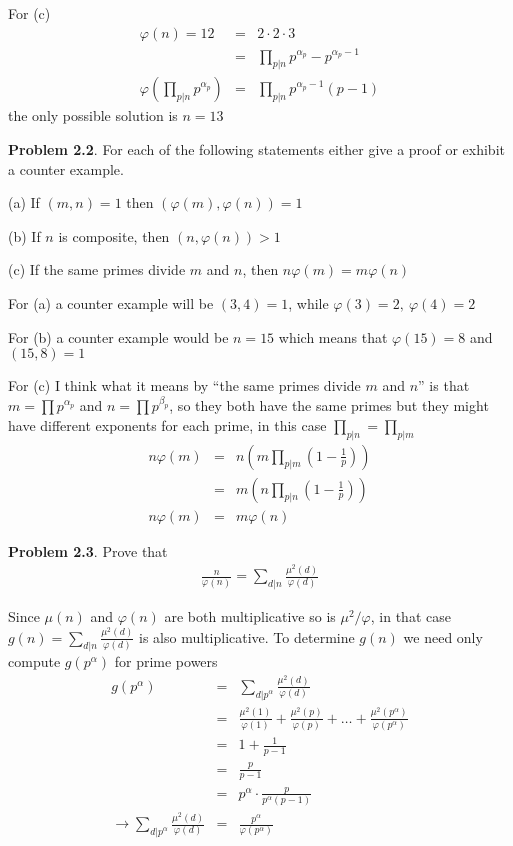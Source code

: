 \documentclass[aps,preprint,preprintnumbers,nofootinbib,showpacs,prd]{revtex4-1}
\newcommand{\nbea}{\begin{eqnarray*}}
\newcommand{\neea}{\end{eqnarray*}}
\begin{document}
For (c)
%
\nbea
\varphi(n) = 12 & = & 2 \cdot 2 \cdot 3 \\
& = & \prod_{p|n} p^{\alpha_p} - p^{\alpha_p-1} \\
\varphi\left (\prod_{p|n} p^{\alpha_p} \right ) & = & \prod_{p|n}p^{\alpha_p-1} (p - 1)
\neea
%
the only possible solution is $n=13$

{\bf Problem 2.2}. For each of the following statements either give a proof or exhibit a counter example.

(a) If $(m,n)=1$ then $(\varphi(m),\varphi(n)) = 1$

(b) If $n$ is composite, then $(n, \varphi(n)) > 1$

(c) If the same primes divide $m$ and $n$, then $n\varphi(m) = m\varphi(n)$

For (a) a counter example will be $(3,4) = 1$, while $\varphi(3) = 2, ~\varphi(4) = 2$

For (b) a counter example would be $n = 15$ which means that $\varphi(15) = 8$ and $(15,8) = 1$

For (c) I think what it means by ``the same primes divide $m$ and $n$'' is that $m = \prod p^{\alpha_p}$ and $n = \prod p^{\beta_p}$, so they both have the same primes but they might have different exponents for each prime, in this case $\prod_{p|n} = \prod_{p|m}$
%
\nbea
n\varphi(m) & = & n \left ( m \prod_{p|m} \left ( 1 - \frac{1}{p}\right ) \right ) \\
& = & m \left ( n \prod_{p|n} \left ( 1 - \frac{1}{p}\right ) \right ) \\
n\varphi(m) & = & m\varphi(n)
\neea
%

{\bf Problem 2.3}. Prove that
%
\nbea
\frac{n}{\varphi(n)} = \sum_{d|n} \frac{\mu^2(d)}{\varphi(d)}
\neea
%

Since $\mu(n)$ and $\varphi(n)$ are both multiplicative so is $\mu^2/\varphi$, in that case $g(n) = \sum_{d|n} \frac{\mu^2(d)}{\varphi(d)}$ is also multiplicative. To determine $g(n)$ we need only compute $g(p^\alpha)$ for prime powers
%
\nbea
g(p^\alpha) & = & \sum_{d|p^\alpha} \frac{\mu^2(d)}{\varphi(d)} \\
& = & \frac{\mu^2(1)}{\varphi(1)} + \frac{\mu^2(p)}{\varphi(p)} + \ldots + \frac{\mu^2(p^\alpha)}{\varphi(p^\alpha)} \\
& = & 1 + \frac{1}{p - 1} \\
& = & \frac{p}{p - 1} \\
& = & p^\alpha \cdot \frac{p}{p^\alpha(p - 1)} \\
\to \sum_{d|p^\alpha} \frac{\mu^2(d)}{\varphi(d)}& = & \frac{p^\alpha}{\varphi(p^\alpha)}
\neea
%
\end{document}
